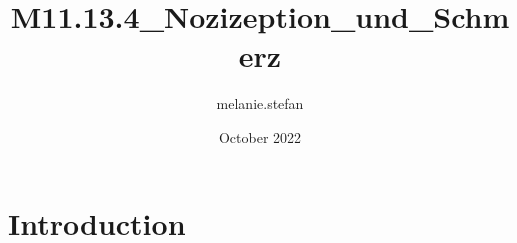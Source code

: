 \documentclass{article}
\title{M11.13.4_Nozizeption_und_Schmerz}
\author{melanie.stefan }
\date{October 2022}
\begin{document}
\maketitle

\section{Introduction}
\end{document}
